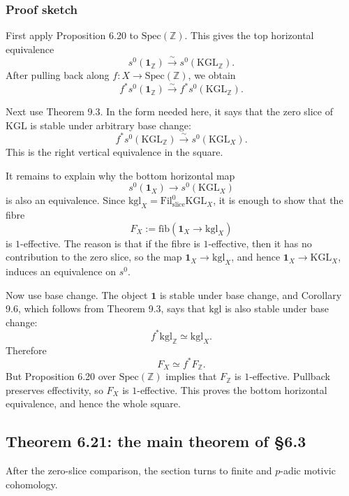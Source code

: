 \documentclass[11pt,a4paper]{article}
\newcommand{\Z}{\mathbb Z}
\newcommand{\Spec}{\mathrm{Spec}}
\newcommand{\KGL}{\mathrm{KGL}}
\newcommand{\kgl}{\mathrm{kgl}}
\newcommand{\Fil}{\mathrm{Fil}}
\newcommand{\fib}{\mathrm{fib}}
\newcommand{\1}{\mathbf 1}
\newcommand{\slic}{\mathrm{slice}}
\theoremstyle{bemstyle}
\theoremstyle{definition}
\begin{document}
\subsubsection{Proof sketch}

First apply Proposition 6.20 to \(\Spec(\Z)\). This gives the top horizontal equivalence
\[
        s^0(\1_{\Z})\xrightarrow{\sim}s^0(\KGL_{\Z}).
\]
After pulling back along \(f:X\to\Spec(\Z)\), we obtain
\[
        f^*s^0(\1_{\Z})\xrightarrow{\sim}f^*s^0(\KGL_{\Z}).
\]

Next use Theorem 9.3. In the form needed here, it says that the zero slice of \(\KGL\) is stable under arbitrary base change:
\[
        f^*s^0(\KGL_{\Z})\xrightarrow{\sim}s^0(\KGL_X).
\]
This is the right vertical equivalence in the square.

It remains to explain why the bottom horizontal map
\[
        s^0(\1_X)\longrightarrow s^0(\KGL_X)
\]
is also an equivalence. Since \(\kgl_X=\Fil^0_{\slic}\KGL_X\), it is enough to show that the fibre
\[
        F_X:=\fib(\1_X\to\kgl_X)
\]
is \(1\)-effective. The reason is that if the fibre is \(1\)-effective, then it has no contribution to the zero slice, so the map \(\1_X\to\kgl_X\), and hence \(\1_X\to\KGL_X\), induces an equivalence on \(s^0\).

Now use base change. The object \(\1\) is stable under base change, and Corollary 9.6, which follows from Theorem 9.3, says that \(\kgl\) is also stable under base change:
\[
        f^*\kgl_{\Z}\simeq \kgl_X.
\]
Therefore
\[
        F_X\simeq f^*F_{\Z}.
\]
But Proposition 6.20 over \(\Spec(\Z)\) implies that \(F_{\Z}\) is \(1\)-effective. Pullback preserves effectivity, so \(F_X\) is \(1\)-effective. This proves the bottom horizontal equivalence, and hence the whole square.



\subsection{Theorem 6.21: the main theorem of \S6.3}

After the zero-slice comparison, the section turns to finite and \(p\)-adic motivic cohomology.
\end{document}
